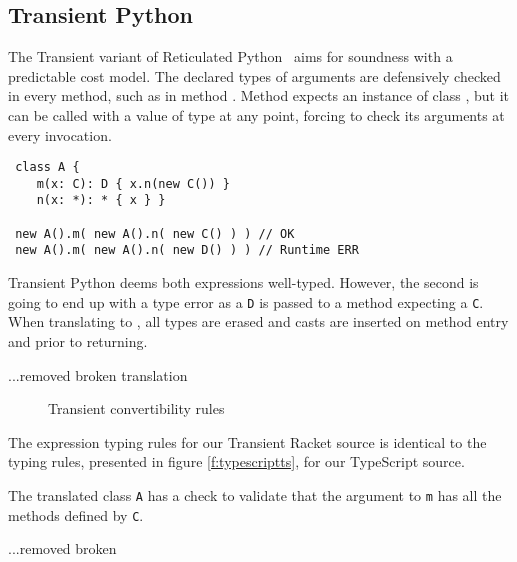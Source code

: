 \documentclass[acmlarge, anonymous, authordraft]{acmart}
\newcommand{\code}[1]{{\tt #1}\xspace}
\begin{document}
\subsection{Transient Python}

The Transient variant of Reticulated Python~\cite{siek14} aims for soundness
with a predictable cost model. The declared types of arguments are defensively
checked in every method, such as in method \m. Method \m expects an instance of
class \C, but it can be called with a value of type \any at any point, forcing
\m to check its arguments at every invocation.

\begin{lstlisting}
 class A {
    m(x: C): D { x.n(new C()) }
    n(x: *): * { x } }

 new A().m( new A().n( new C() ) ) // OK
 new A().m( new A().n( new D() ) ) // Runtime ERR
\end{lstlisting}

\noindent Transient Python deems both expressions well-typed. However, the
second is going to end up with a type error as a \code D is passed to a method
expecting a \code C.  When translating to \kafka, all types are erased and casts
are inserted on method entry and prior to returning.

...removed broken translation 

\begin{figure}
\hrulefill
\begin{mathpar}




\end{mathpar}
\hrulefill
\caption{Transient convertibility rules}\label{f:transientts}
\end{figure}

The expression typing rules for our Transient Racket source is identical to the 
typing rules, presented in figure \ref{f:typescriptts}, for our TypeScript source.

\noindent The translated class \code A has a check to validate that the
argument to \code m has all the methods defined by \code C.

...removed broken
\end{document}
